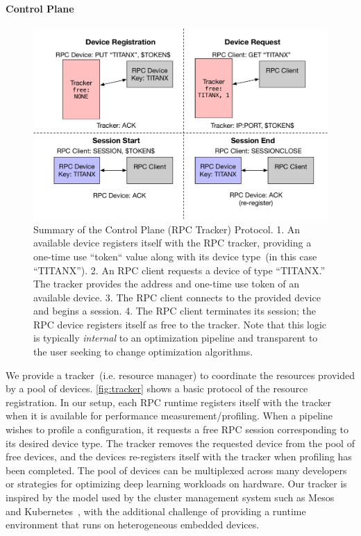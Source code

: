 \paragraph{Control Plane}
\begin{figure}[t!]
\includegraphics[width=\textwidth]{sys_diagrams/tracker.pdf}
\caption{Summary of the Control Plane (RPC Tracker) Protocol.
  1. An available device registers itself with the RPC tracker, providing a one-time use ``token`` value along with its device type~(in this case ``TITANX'').
  2. An RPC client requests a device of type ``TITANX.'' The tracker provides the address and one-time use token of an available device.
  3. The RPC client connects to the provided device and begins a session.
  4. The RPC client terminates its session; the RPC device registers itself as free to the tracker.
  Note that this logic is typically \emph{internal} to an optimization pipeline and transparent to the user seeking to change optimization algorithms.
}\label{fig:tracker}
\end{figure}
We provide a tracker~(i.e. resource manager) to coordinate the resources provided by a pool of devices.
\autoref{fig:tracker} shows a basic protocol of the resource registration.
In our setup, each RPC runtime registers itself with the tracker when it is available for performance measurement/profiling.
When a pipeline wishes to profile a configuration, it requests a free RPC session corresponding to its desired device type.
The tracker removes the requested device from the pool of free devices, and the devices re-registers itself with the tracker when profiling has been completed.
The pool of devices can be multiplexed across many developers or strategies for optimizing deep learning workloads on hardware.
Our tracker is inspired by the model used by the cluster management system such as
Mesos~\cite{Hindman:Mesos} and Kubernetes~\cite{Burns:2016:BOK:2930840.2890784}, with the additional challenge of providing a runtime environment that runs on heterogeneous embedded devices.

